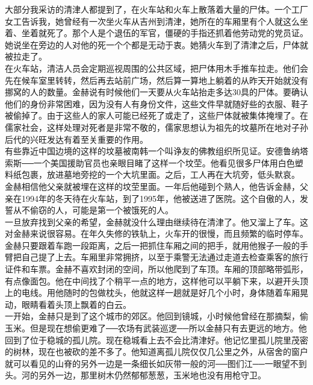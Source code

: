 大部分我采访的清津人都提到了，在火车站和火车上散落着大量的尸体。一个工厂女工告诉我，她曾经有一次坐火车从吉州到清津，她所在的车厢里有个人就这么坐着、坐着就死了。那个人是个退伍的军官，僵硬的手指还抓着他劳动党的党员证。她说坐在旁边的人对他的死一个个都是无动于衷。她猜火车到了清津之后，尸体就被拉走了。\\

在火车站，清洁人员会定期巡视周围的公共区域，把尸体用木手推车拉走。他们会先在候车室里转转，然后再去站前广场，然后算一算地上躺着的从昨天开始就没有挪窝的人的数量。金赫说有时候他们一天要从火车站抬走多达30具的尸体。要确认他们的身份非常困难，因为没有人有身份文件，这些文件早就随好些的衣服、鞋子被偷掉了。由于这些人的家人可能已经死了或走了，这些尸体就被集体掩埋了。在儒家社会，这样处理对死者是非常不敬的，儒家思想认为祖先的坟墓所在地对子孙后代的兴旺发达有着至关重要的作用。\\

有些靠近中国边境的这样的坟墓被南韩一个叫诤友的佛教组织所见证。安德鲁纳塔索斯──一个美国援助官员也亲眼目睹了这样一个坟茔。他看见很多尸体用白色塑料纸包裹，放进墓地旁挖的一个大坑里面。之后，工人再在大坑旁，低头默哀。\\

金赫相信他父亲就被埋在这样的坟茔里面。一年后他碰到个熟人，他告诉金赫，父亲在1994年的冬天待在火车站，到了1995年，他被送进了医院。这个自傲的人，发誓从不偷窃的人，可能是第一个被饿死的人。\\

一旦放弃找到父亲的希望，金赫就没什么理由继续待在清津了。他又溜上了车。这对金赫来说很容易。在年久失修的铁轨上，火车开的很慢，而且频繁的临时停车。金赫只要跟着车跑一段距离，之后一把抓住车厢之间的把手，就用他猴子一般的手臂把自己提了上去。车厢里非常拥挤，以至于乘警无法通过走道去检查乘客的旅行证件和车票。金赫不喜欢封闭的空间，所以他爬到了车顶。车厢的顶部略带弧形，有点像面包。他在中间找了个稍平一点的地方，这样他可以平躺下来，以避开头顶上的电线。用他随时的包做枕头，他就这样一趟就是好几个小时，身体随着车厢晃动，眼睛看着头顶上飘着的白云。\\

一开始，金赫只是到了这个城市的郊区。他回到镜城，小时候他曾经在那摘梨，偷玉米。但是现在想偷更难了──农场有武装巡逻──所以金赫只有去更远的地方。他回到了位于稳城的孤儿院。现在稳城看上去不会比清津好。他记忆里孤儿院里茂密的树林，现在也被砍的差不多了。他知道离孤儿院仅仅几公里之外，从宿舍的窗户就可以看见的山脊的另外一边是一条细长如灰带一般的河──图们江──一眼望不到头。河的另外一边，那里树木仍然郁郁葱葱，玉米地也没有用枪守卫。\\


